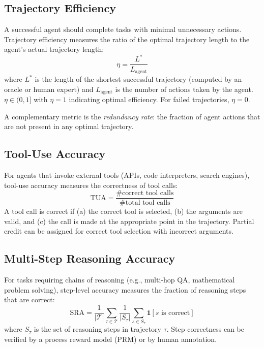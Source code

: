 \subsection{Trajectory Efficiency}
\label{trajectory-efficiency}

A successful agent should complete tasks with minimal unnecessary actions. Trajectory efficiency measures the ratio of the optimal trajectory length to the agent’s actual trajectory length: 
\begin{equation}
    \eta = \frac{L^*}{L_{\text{agent}}}
\end{equation}
 where $L^*$ is the length of the shortest successful trajectory (computed by an oracle or human expert) and $L_{\text{agent}}$ is the number of actions taken by the agent. $\eta \in (0, 1]$ with $\eta = 1$ indicating optimal efficiency. For failed trajectories, $\eta = 0$.

A complementary metric is the \emph{redundancy rate}: the fraction of agent actions that are not present in any optimal trajectory.

\subsection{Tool-Use Accuracy}
\label{tool-use-accuracy}

For agents that invoke external tools (APIs, code interpreters, search engines), tool-use accuracy measures the correctness of tool calls: 
\begin{equation}
    \text{TUA} = \frac{\text{\# correct tool calls}}{\text{\# total tool calls}}
\end{equation}
 A tool call is correct if (a) the correct tool is selected, (b) the arguments are valid, and (c) the call is made at the appropriate point in the trajectory. Partial credit can be assigned for correct tool selection with incorrect arguments.

\subsection{Multi-Step Reasoning Accuracy}
\label{multi-step-reasoning-accuracy}

For tasks requiring chains of reasoning (e.g., multi-hop QA, mathematical problem solving), step-level accuracy measures the fraction of reasoning steps that are correct: 
\begin{equation}
    \text{SRA} = \frac{1}{|\mathcal{T}|} \sum_{\tau \in \mathcal{T}} \frac{1}{|S_\tau|} \sum_{s \in S_\tau} \mathbf{1}[s \text{ is correct}]
\end{equation}
 where $S_\tau$ is the set of reasoning steps in trajectory $\tau$. Step correctness can be verified by a process reward model (PRM) or by human annotation.


